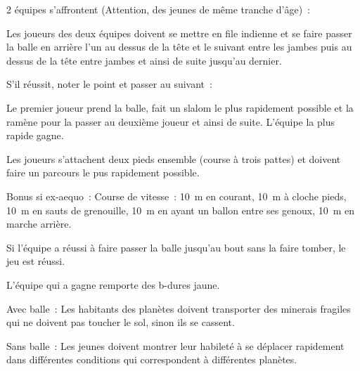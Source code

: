 \documentclass{grand-jeu}
\begin{document}
\begin{regles}
2 équipes s’affrontent (Attention, des jeunes de même tranche d'âge) :

Les joueurs des deux équipes doivent se mettre en file indienne et se faire passer la balle en arrière l’un au dessus de la tête et le suivant entre les jambes puis au dessus de la tête entre jambes et ainsi de suite jusqu’au dernier.

\vspace{0.2cm}

S'il réussit, noter le point et passer au suivant :

Le premier joueur prend la balle, fait un slalom le plus rapidement possible et la ramène pour la passer au deuxième joueur et ainsi de suite. L’équipe la plus rapide gagne.

Les joueurs s’attachent deux pieds ensemble (course à trois pattes) et doivent faire un parcours le pus rapidement possible.

\vspace{0.2cm}

Bonus si ex-aequo : Course de vitesse : 10 m en courant, 10 m à cloche pieds, 10 m en sauts de grenouille, 10 m en ayant un ballon entre ses genoux, 10 m en marche arrière.

Si l’équipe a réussi à faire passer la balle jusqu’au bout sans la faire tomber, le jeu est réussi.

L’équipe qui a gagne remporte des b-dures jaune.
\end{regles}

\begin{imaginaire}
Avec balle : Les habitants des planètes doivent transporter des minerais fragiles qui ne doivent pas toucher le sol, sinon ils se cassent.

Sans balle : Les jeunes doivent montrer leur habileté à se déplacer rapidement dans différentes conditions qui correspondent à différentes planètes.
\end{imaginaire}

\begin{moments-stop}
\end{moments-stop}
\end{document}
